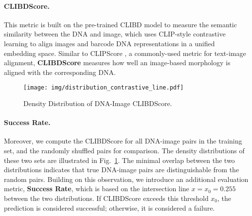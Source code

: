 \paragraph{CLIBDScore.}
This metric is built on the pre-trained CLIBD model \cite{gong2024clibd} to measure the semantic similarity between the DNA and image, which uses CLIP-style \cite{radford2021learning} contrastive learning to align images and barcode DNA representations in a unified embedding space.
Similar to CLIPScore \cite{hessel2021clipscore}, a commonly-used metric for text-image alignment, \textbf{CLIBDScore} measures how well an image-based morphology is aligned with the corresponding DNA.

\begin{figure}[h]
    \centering
    \texttt{[image: img/distribution\_contrastive\_line.pdf]}
    \vspace{-2mm}
    \caption{Density Distribution of DNA-Image CLIBDScore.}
    \label{fig:CLIBDScore_Distribution}
    \vspace{-8mm}
\end{figure}

\paragraph{Success Rate.}
Moreover, we compute the CLIBDScore for all DNA-image pairs in the training set, and the randomly shuffled pairs for comparison. 
The density distributions of these two sets are illustrated in Fig.~\ref{fig:CLIBDScore_Distribution}.
The minimal overlap between the two distributions indicates that true DNA-image pairs are distinguishable from the random pairs. 
Building on this observation, we introduce an additional evaluation metric, \textbf{Success Rate}, which is based on the intersection line $x=x_0=0.255$ between the two distributions. If CLIBDScore exceeds this threshold $x_0$, the prediction is considered successful; otherwise, it is considered a failure.

\vspace{-5mm}
